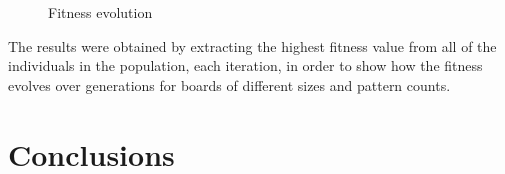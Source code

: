 \documentclass{llncs}
\begin{document}
\begin{figure}[H]
  \centering
  \hspace{40mm}
  \caption{Fitness evolution}
  \label{fig:fitness_evolution}
\end{figure}

The results were obtained by extracting the highest fitness value from all of the individuals in the population, each iteration, in order to show how the fitness evolves over generations for boards of different sizes and pattern counts.

\section{Conclusions}\label{sec:conclusions}
\end{document}
